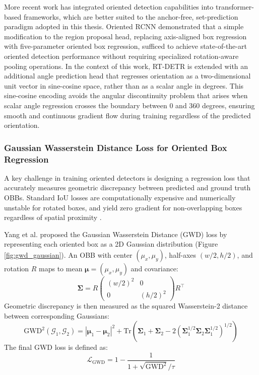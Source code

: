 More recent work has integrated oriented detection capabilities into transformer-based frameworks, which are better suited to the anchor-free, set-prediction paradigm adopted in this thesis. Oriented RCNN \cite{Xie2021} demonstrated that a simple modification to the region proposal head, replacing axis-aligned box regression with five-parameter oriented box regression, sufficed to achieve state-of-the-art oriented detection performance without requiring specialized rotation-aware pooling operations. In the context of this work, RT-DETR is extended with an additional angle prediction head that regresses orientation as a two-dimensional unit vector in sine-cosine space, rather than as a scalar angle in degrees. This sine-cosine encoding avoids the angular discontinuity problem that arises when scalar angle regression crosses the boundary between 0 and 360 degrees, ensuring smooth and continuous gradient flow during training regardless of the predicted orientation.

\subsubsection{Gaussian Wasserstein Distance Loss for Oriented Box Regression}

A key challenge in training oriented detectors is designing a regression loss that accurately measures geometric discrepancy between predicted and ground truth OBBs. Standard IoU losses are computationally expensive and numerically unstable for rotated boxes, and yield zero gradient for non-overlapping boxes regardless of spatial proximity \cite{Yang2022}.

Yang et al. \cite{Yang2022} proposed the Gaussian Wasserstein Distance (GWD) loss by representing each oriented box as a 2D Gaussian distribution (Figure \ref{fig:gwd_gaussian}). An OBB with center $(\mu_x, \mu_y)$, half-axes $(w/2, h/2)$, and rotation $R$ maps to mean $\boldsymbol{\mu} = (\mu_x, \mu_y)$ and covariance:
\begin{equation}
\boldsymbol{\Sigma} = R \begin{pmatrix} (w/2)^2 & 0 \\ 0 & (h/2)^2 \end{pmatrix} R^\top
\end{equation}
\newpage
Geometric discrepancy is then measured as the squared Wasserstein-2 distance between corresponding Gaussians:
\begin{equation}
\text{GWD}^2(\mathcal{G}_1, \mathcal{G}_2) = |\boldsymbol{\mu}_1 - \boldsymbol{\mu}_2|^2 + \text{Tr}\left(\boldsymbol{\Sigma}_1 + \boldsymbol{\Sigma}_2 - 2\left(\boldsymbol{\Sigma}_1^{1/2} \boldsymbol{\Sigma}_2 \boldsymbol{\Sigma}_1^{1/2}\right)^{1/2}\right)
\end{equation}
The final GWD loss is defined as:
\begin{equation}
\mathcal{L}_{\text{GWD}} = 1 - \frac{1}{1 + \sqrt{\text{GWD}^2} / \tau}
\end{equation}

